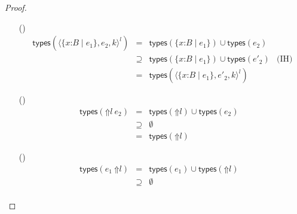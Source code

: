 \documentclass[9pt]{extarticle}
\newcommand{\ottnt}[1]{\mathit{#1}}
\newcommand{\ottmv}[1]{\mathit{#1}}
\newcommand{\ottsym}[1]{#1}
\begin{document}
\begin{lemma}
\begin{proof}
{\begin{itemize}
\[\begin{array}{rclr}
        &\supseteq& \bigcup_{1 \le j \le i}  \mathsf{types} ( \ottnt{e_{\ottmv{j}}} )  \cup  \mathsf{types} ( \ottnt{e'_{\ottmv{i}}} )  \cup \bigcup_{i+1 \le j \le n}  \mathsf{types} ( \ottnt{e_{\ottmv{j}}} )  & \text{(IH)} \\
        &=&  \mathsf{types} ( \ottnt{op}  \ottsym{(}  \ottnt{e_{{\mathrm{1}}}}  \ottsym{,}  \dots  \ottsym{,}  \ottnt{e_{{\ottmv{i}-1}}}  \ottsym{,}  \ottnt{e'_{\ottmv{i}}}  \ottsym{,}  \dots  \ottsym{,}  \ottnt{e_{\ottmv{n}}}  \ottsym{)} ) 
      \end{array} \]
    \item[(\E{CheckInner})]  \[ \begin{array}{rclr}
         \mathsf{types} (  \langle   \{ \mathit{x} \mathord{:} \ottnt{B} \mathrel{\mid} \ottnt{e_{{\mathrm{1}}}} \}  ,  \ottnt{e_{{\mathrm{2}}}} ,  \ottnt{k}  \rangle^{ \ottnt{l} }  )  &=&   \mathsf{types} (  \{ \mathit{x} \mathord{:} \ottnt{B} \mathrel{\mid} \ottnt{e_{{\mathrm{1}}}} \}  )   \cup   \mathsf{types} ( \ottnt{e_{{\mathrm{2}}}} )    & \\
        &\supseteq&   \mathsf{types} (  \{ \mathit{x} \mathord{:} \ottnt{B} \mathrel{\mid} \ottnt{e_{{\mathrm{1}}}} \}  )   \cup   \mathsf{types} ( \ottnt{e'_{{\mathrm{2}}}} )   & \text{(IH)} \\
        &=&  \mathsf{types} (  \langle   \{ \mathit{x} \mathord{:} \ottnt{B} \mathrel{\mid} \ottnt{e_{{\mathrm{1}}}} \}  ,  \ottnt{e'_{{\mathrm{2}}}} ,  \ottnt{k}  \rangle^{ \ottnt{l} }  ) 
      \end{array} \]
    \item[(\E{AppRaiseL})]  \[ \begin{array}{rclr}
         \mathsf{types} (   \mathord{\Uparrow}  \ottnt{l}  ~ \ottnt{e_{{\mathrm{2}}}}  )  &=&   \mathsf{types} (  \mathord{\Uparrow}  \ottnt{l}  )   \cup   \mathsf{types} ( \ottnt{e_{{\mathrm{2}}}} )  & \\
        &\supseteq&  \emptyset  & \\
        &=&  \mathsf{types} (  \mathord{\Uparrow}  \ottnt{l}  ) 
      \end{array} \]
    \item[(\E{AppRaiseR})]  \[ \begin{array}{rclr}
         \mathsf{types} (  \ottnt{e_{{\mathrm{1}}}} ~  \mathord{\Uparrow}  \ottnt{l}   )  &=&   \mathsf{types} ( \ottnt{e_{{\mathrm{1}}}} )   \cup   \mathsf{types} (  \mathord{\Uparrow}  \ottnt{l}  )   & \\
        &\supseteq&  \emptyset  & \\

\end{array}\]
\end{itemize}}
\end{proof}
\end{lemma}
\end{document}
